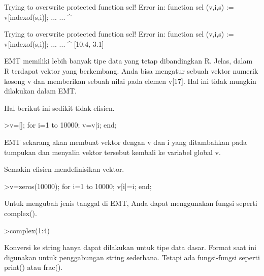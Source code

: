 \documentclass[a4paper,10pt]{article}
\begin{document}
\begin{eulernotebook}
\begin{eulercomment}
\begin{eulercomment}
\begin{eulercomment}
\begin{eulercomment}
\begin{euleroutput}
  Trying to overwrite protected function sel!
  Error in:
  function sel (v,i,s) := v[indexof(s,i)]; ... ...
               ^
  
  Trying to overwrite protected function sel!
  Error in:
  function sel (v,i,s) := v[indexof(s,i)]; ... ...
               ^
  [10.4,  3.1]
\end{euleroutput}
\begin{eulercomment}
EMT memiliki lebih banyak tipe data yang tetap dibandingkan R. Jelas,
dalam R terdapat vektor yang berkembang. Anda bisa mengatur sebuah
vektor numerik kosong v dan memberikan sebuah nilai pada elemen v[17].
Hal ini tidak mungkin dilakukan dalam EMT.

Hal berikut ini sedikit tidak efisien.
\end{eulercomment}
\begin{eulerprompt}
>v=[]; for i=1 to 10000; v=v|i; end;
\end{eulerprompt}
\begin{eulercomment}
EMT sekarang akan membuat vektor dengan v dan i yang ditambahkan pada
tumpukan dan menyalin vektor tersebut kembali ke variabel global v.

Semakin efisien mendefinisikan vektor.
\end{eulercomment}
\begin{eulerprompt}
>v=zeros(10000); for i=1 to 10000; v[i]=i; end;
\end{eulerprompt}
\begin{eulercomment}
Untuk mengubah jenis tanggal di EMT, Anda dapat menggunakan fungsi
seperti complex().
\end{eulercomment}
\begin{eulerprompt}
>complex(1:4)
\end{eulerprompt}
\begin{euleroutput}
  [ 1+0i ,  2+0i ,  3+0i ,  4+0i  ]
\end{euleroutput}
\begin{eulercomment}
Konversi ke string hanya dapat dilakukan untuk tipe data dasar. Format
saat ini digunakan untuk penggabungan string sederhana. Tetapi ada
fungsi-fungsi seperti print() atau frac().


\end{eulercomment}
\end{eulercomment}
\end{eulercomment}
\end{eulercomment}
\end{eulercomment}
\end{eulernotebook}
\end{document}

